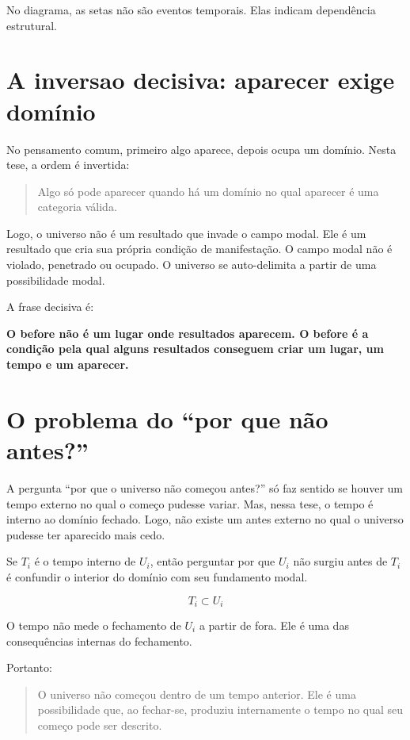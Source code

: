 \documentclass[11pt,a4paper]{article}
\newenvironment{corebox}{\begin{framed}\small\bfseries}{\end{framed}}
\begin{document}
No diagrama, as setas não são eventos temporais. Elas indicam dependência estrutural.

\section{A inversao decisiva: aparecer exige domínio}

No pensamento comum, primeiro algo aparece, depois ocupa um domínio. Nesta tese, a ordem é invertida:

\begin{quote}
Algo só pode aparecer quando há um domínio no qual aparecer é uma categoria válida.
\end{quote}

Logo, o universo não é um resultado que invade o campo modal. Ele é um resultado que cria sua própria condição de manifestação. O campo modal não é violado, penetrado ou ocupado. O universo se auto-delimita a partir de uma possibilidade modal.

A frase decisiva é:

\begin{corebox}
O before não é um lugar onde resultados aparecem. O before é a condição pela qual alguns resultados conseguem criar um lugar, um tempo e um aparecer.
\end{corebox}

\section{O problema do ``por que não antes?''}

A pergunta ``por que o universo não começou antes?'' só faz sentido se houver um tempo externo no qual o começo pudesse variar. Mas, nessa tese, o tempo é interno ao domínio fechado. Logo, não existe um antes externo no qual o universo pudesse ter aparecido mais cedo.

Se \(T_i\) é o tempo interno de \(U_i\), então perguntar por que \(U_i\) não surgiu antes de \(T_i\) é confundir o interior do domínio com seu fundamento modal.

\[
T_i \subset U_i
\]

O tempo não mede o fechamento de \(U_i\) a partir de fora. Ele é uma das consequências internas do fechamento.

Portanto:

\begin{quote}
O universo não começou dentro de um tempo anterior. Ele é uma possibilidade que, ao fechar-se, produziu internamente o tempo no qual seu começo pode ser descrito.
\end{quote}
\end{document}
